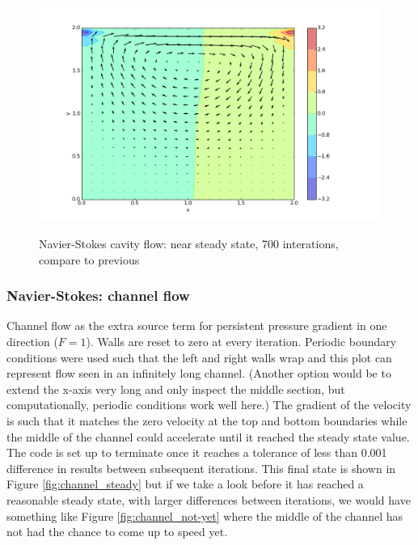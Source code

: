 \documentclass[11pt]{article}
\begin{document}
{	\begin{figure}[H]
	\centering
	\caption{Navier-Stokes cavity flow: near steady state, 700 interations, compare to previous}
	\includegraphics[scale=0.57]{cavity_final.png}
	\label{fig:cavity_final}
	\end{figure}

\subsubsection{Navier-Stokes: channel flow}
Channel flow as the extra source term for persistent pressure gradient in one direction
($F=1$). Walls are reset to zero at every iteration.
Periodic boundary conditions were used such that the left and right walls wrap and this plot
can represent flow seen in an infinitely long channel. (Another option would be to extend
the x-axis very long and only inspect the middle section, but computationally, periodic
conditions work well here.)
The gradient of the velocity is such that it matches
the zero velocity at the top and bottom boundaries while the middle of the channel could
accelerate until it reached the steady state value.
The code is set up to terminate once it reaches a tolerance of less than 0.001 difference
in results between subsequent iterations. This final state is shown in Figure
\ref{fig:channel_steady} but if we take a look before it has reached a reasonable steady state,
with larger differences between iterations, we would have something like Figure
\ref{fig:channel_not-yet} where the middle of the channel has not had the chance to come
up to speed yet.

}
\end{document}
